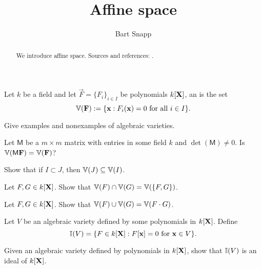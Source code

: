 \documentclass{ximera}
\author{Bart Snapp}
\title{Affine space}
\begin{document}
\begin{abstract}
  We introduce affine space. Sources and references:
  \cite{mR1995, SKKT2002}.
\end{abstract}
\maketitle

\begin{definition}
  Let $k$ be a field and let $\vec{F} = \{F_{i}\}_{i\in I}$ be polynomials
  $k[\mathbf X]$, an  is the set
  \[
  \mathbb V(\mathbf{F}) := \{\mathbf{x}: \text{$F_i(\mathbf{x}) = 0$ for all $i\in I$}\}.
  \]
\end{definition}


\begin{exercise}
  Give examples and nonexamples of algebraic varieties.
\end{exercise}





\begin{exercise}
  Let $\mathsf{M}$ be a $m\times m$ matrix with entries in some field
  $k$ and $\det(\mathsf{M}) \ne 0$. Is $\mathbb V( \mathsf{M} \mathbf{F}) =
  \mathbb V(\mathbf{F})$?
\end{exercise}


\begin{exercise}
  Show that if $I\subset J$, then $\mathbb V(J) \subseteq \mathbb V(I)$.
\end{exercise}

\begin{exercise}
  Let $F,G\in k[\mathbf X]$. Show that $\mathbb V(F) \cap\mathbb V(G) = \mathbb V(\{F,G\})$.
\end{exercise}


\begin{exercise}
  Let $F,G\in k[\mathbf X]$. Show that $\mathbb V(F) \cup\mathbb V(G) = \mathbb V(F\cdot G)$.
\end{exercise}





\begin{definition}
  Let $V$ be an algebraic variety defined by some polynomials in
  $k[\mathbf X]$. Define
  \[
  \mathbb I(V) = \{F\in k[\mathbf X]:F[\mathbf{x}] = 0 \text{ for } \mathbf{x} \in V\}.
  \]
\end{definition}

\begin{exercise}
  Given an algebraic variety defined by polynomials in $k[\mathbf X]$, show
  that $\mathbb I(V)$ is an ideal of $k[\mathbf X]$.
\end{exercise}
\end{document}
